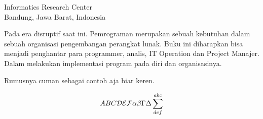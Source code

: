 

{Informatics Research Center\\
Bandung, Jawa Barat, Indonesia}

Pada era disruptif   
saat ini. Pemrograman merupakan sebuah kebutuhan dalam sebuah organisasi pengembangan perangkat lunak.
Buku ini diharapkan bisa menjadi penghantar para programmer, analis, IT Operation dan Project Manajer.
Dalam melakukan implementasi program pada diri dan organisasinya.

Rumusnya cuman sebagai contoh aja biar keren.

\begin{equation}
ABC {\cal DEF} \alpha\beta\Gamma\Delta\sum^{abc}_{def}
\end{equation}
